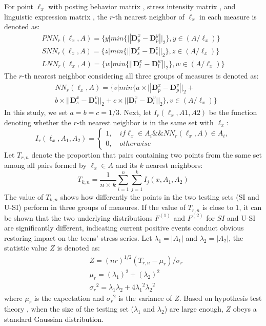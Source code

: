 For point $\ell_x$ with posting behavior matrix , stress intensity matrix ,
and linguistic expression matrix ,
the $r$-th nearest neighbor of $\ell_x$ in each measure is denoted as:
\begin{equation}
\begin{aligned}
& PNN_r(\ell_x,A)
= \{y | min\{||\textbf{D}_p^x-\textbf{D}_p^y ||_2\}, y\in(A/\ell_x)\} &\\
& SNN_r(\ell_x,A)
= \{z | min\{||\textbf{D}_s^x-\textbf{D}_s^z ||_2\}, z\in(A/\ell_x)\} \\
& LNN_r(\ell_x,A)
= \{w | min\{||\textbf{D}_l^x-\textbf{D}_l^w ||_2\}, w\in(A/\ell_x)\} &
 \end{aligned}
 \end{equation}
The $r$-th nearest neighbor considering all three groups of measures is denoted as:
\begin{align}
&NN_r(\ell_x,A) = \{v | min\{a \times ||\textbf{D}_p^x-\textbf{D}_p^v||_2+\\
&b \times ||\textbf{D}_s^x-\textbf{D}_s^v||_2+
c \times ||\textbf{D}_l^x-\textbf{D}_l^v||_2\}, v\in(A/\ell_x) \}
\end{align}
In this study, we set $a = b = c = 1/3$.
Next, let $I_r(\ell_x,A1,A2)$ be the function denoting whether the $r$-th nearest neighbor is in the same set with $\ell_x$:
\begin{equation}
I_r(\ell_x,A_1,A_2) =
\left\{ \begin{array}{ll}
1, \quad if \ell_x \in A_i  \&\& NN_r(\ell_x,A)\in A_i,\\
0, \quad otherwise
\end{array}
\right.
\end{equation}
Let $T_{r,n}$ denote the proportion that pairs containing two points from the same set among all pairs formed by $\ell_x \in A$
and its $k$ nearest neighbors:
\begin{equation}
T_{k,n}= \frac{1}{n\times k}\sum_{i=1}^{n}\sum_{j=1}^{k}I_j(x,A_1,A_2)
\end{equation}
The value of $T_{k,n}$ shows how differently the points in the two testing sets (SI and U-SI) perform in three groups of measures.
If the value of $T_{r,n}$ is close to $1$,
it can be shown that the two underlying distributions $F^{(1)}$ and $F^{(2)}$ for $SI$ and U-SI are significantly different,
indicating current positive events conduct obvious restoring impact on the teens' stress series.
Let $\lambda_1=|A_1|$ and $\lambda_2=|A_2|$, the statistic value $Z$ is denoted as:
\begin{align}
&Z=(nr)^{1/2}(T_{r,n}-\mu_{r})/\sigma_{r}\\
&\mu_r=(\lambda_1)^2+(\lambda_2)^2\\
&{\sigma_r}^2=\lambda_1\lambda_2+4{\lambda_1}^2{\lambda_2}^2
\end{align}
where $\mu_r$ is the expectation and ${\sigma_r}^2$ is the variance of $Z$.
Based on hypothesis test theory \cite{Johnson2012Applied},
when the size of the testing set ($\lambda_1$ and $\lambda_2$) are large enough,
$Z$ obeys a standard Gaussian distribution.

